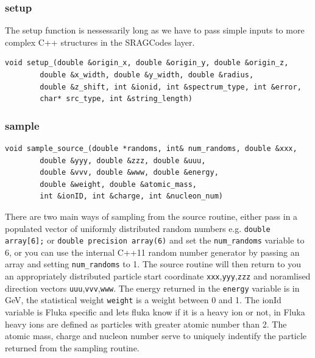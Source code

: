 \subsubsection*{setup}
The setup function is nessessarily long as we have to pass simple inputs to more complex C++ structures
in the SRAGCodes layer.
\lstset{language=C++}
\begin{lstlisting}
void setup_(double &origin_x, double &origin_y, double &origin_z,
        double &x_width, double &y_width, double &radius,
        double &z_shift, int &ionid, int &spectrum_type, int &error,
        char* src_type, int &string_length)
\end{lstlisting}

\subsubsection*{sample}
\begin{lstlisting}
void sample_source_(double *randoms, int& num_randoms, double &xxx, 
        double &yyy, double &zzz, double &uuu, 
        double &vvv, double &www, double &energy, 
        double &weight, double &atomic_mass,
        int &ionID, int &charge, int &nucleon_num)
\end{lstlisting}
There are two main ways of sampling from the source routine, either pass in a populated vector
of uniformly distributed random numbers e.g. \texttt{double array[6];} or 
\texttt{double precision array(6)} and set the \texttt{num\_randoms} variable to 6, or you 
can use the internal C++11 random number generator by passing an array and setting
\texttt{num\_randoms} to 1. The source routine will then return to you 
an appropriately distributed particle start coordinate \texttt{xxx},\texttt{yyy},\texttt{zzz} and
noramlised direction vectors \texttt{uuu},\texttt{vvv},\texttt{www}. The energy returned
in the \texttt{energy} variable is in GeV, the statistical weight \texttt{weight} is a weight
between 0 and 1. The ionId variable is Fluka specific and lets fluka know if it is a heavy
ion or not, in Fluka heavy ions are defined as particles with greater atomic number than 2. 
The atomic mass, charge and nucleon number serve to uniquely indentify the particle returned 
from the sampling routine. 



